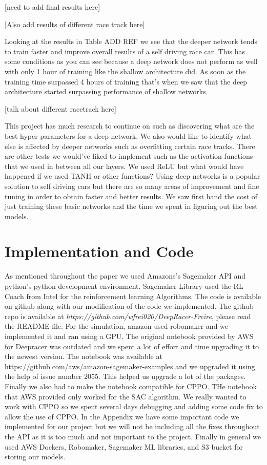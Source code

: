 \documentclass[journal]{IEEEtran}
\begin{document}
[need to add final results here]

[Also add results of different race track here]

Looking at the results in Table ADD REF we see that the deeper network tends to train faster and improve overall results of a self driving race car.  This has some conditions as you can see because a deep network does not perform as well with only 1 hour of training like the shallow architecture did.  As soon as the training time surpassed 4 hours of training that's when we saw that the deep architecture started surpassing performance of shallow networks.  

[talk about different racetrack here]

This project has much research to continue on such as discovering what are the best hyper parameters for a deep network.  We also would like to identify what else is affected by deeper networks such as overfitting certain race tracks.  There are other tests we would've liked to implement such as the activation functions that we used in between all our layers.  We used ReLU but what would have happened if we used TANH or other functions?  Using deep networks is a popular solution to self driving cars but there are so many areas of improvement and fine tuning in order to obtain faster and better results.  We saw first hand the cost of just training these basic networks and the time we spent in figuring out the best models.



\section{Implementation and Code}
As mentioned throughout the paper we used Amazons’s Sagemaker API and python’s python development environment.  Sagemaker Library used the RL Coach from Intel for the reinforcement learning Algorithms.  The code is available on github along with our modification of the code we implemented.  The github repo is available at \emph{https://github.com/wfrei020/DeepRacer-Freire}, please read the README file.  For the simulation, amazon used robomaker and we implemented it and ran using a GPU.  The original notebook provided by AWS for Deepracer was outdated and we spent a lot of effort and time upgrading it to the newest version.  The notebook was available at https://github.com/aws/amazon-sagemaker-examples and we upgraded it using the help of issue number 2055.  This helped us upgrade a lot of the packages.  Finally we also had to make the notebook compatible for CPPO.  THe notebook that AWS provided only worked for the SAC algorithm.  We really wanted to work with CPPO so we spent several days debugging and adding some code fix to allow the use of CPPO.  In the Appendix we have some important code we implemented for our project but we will not be including all the fixes throughout the API as it is too much and not important to the project. Finally in general we used AWS Dockers, Robomaker, Sagemaker ML libraries, and S3 bucket for storing our models. 
\end{document}
